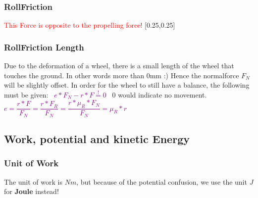 \documentclass[main.tex,fontsize=8pt,paper=a4,paper=portrait,DIV=calc,]{scrartcl}
\begin{document}
\begin{multicols*}{2}
\subsubsection{RollFriction}
\textcolor{red}{This Force is opposite to the propelling force!}\newline
{}[0.25,0.25]

\subsubsection{RollFriction Length}
Due to the deformation of a wheel, there is a small length of the wheel that touches the ground. \newline
In other words more than 0mm :) \newline
Hence the normalforce \(F_N\) will be slightly offset.\newline
In order for the wheel to still have a balance, the following must be given:\newline
\, \newline
\large \textcolor{purple}{\( e * F_N - r * F \overset{!}{=} 0 \)}\newline
\, \newline \normalsize
0 would indicate no movement.\newline
\, \newline
\large \textcolor{purple}{\( e = \dfrac{r * F}{F_N} = \dfrac{r * F_R}{F_N} = \dfrac{r * \mu_R * F_N}{F_N} = \mu_R * r \)}
\, \newline \normalsize

\subsection{Work, potential and kinetic Energy}

\subsubsection{Unit of Work}
The unit of work is \(Nm\), but because of the potential confusion, we use the unit \(J\) for \textbf{Joule} instead!


\end{multicols*}
\end{document}
